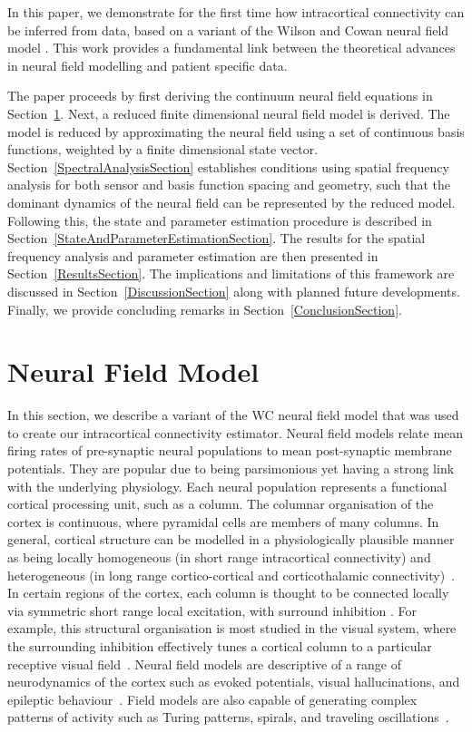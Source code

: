 \documentclass[12pt]{iopart}
\begin{document}
In this paper, we demonstrate for the first time how intracortical connectivity can be inferred from data, based on a variant of the Wilson and Cowan neural field model \cite{Wilson1973}. This work provides a fundamental link between the theoretical advances in neural field modelling and patient specific data.

The paper proceeds by first deriving the continuum neural field equations in Section~\ref{NeuralModelSection}. Next, a reduced finite dimensional neural field model is derived. The model is reduced by approximating the neural field using a set of continuous basis functions, weighted by a finite dimensional state vector. Section~\ref{SpectralAnalysisSection} establishes conditions using spatial frequency analysis for both sensor and basis function spacing and geometry, such that the dominant dynamics of the neural field can be represented by the reduced model. Following this, the state and parameter estimation procedure is described in Section~\ref{StateAndParameterEstimationSection}. The results for the spatial frequency analysis and parameter estimation are then presented in Section~\ref{ResultsSection}. The implications and limitations of this framework are discussed in Section~\ref{DiscussionSection} along with planned future developments. Finally, we provide concluding remarks in Section~\ref{ConclusionSection}.

\section{Neural Field Model}\label{NeuralModelSection} In this section, we describe a variant of the WC neural field model that was used to create our intracortical connectivity estimator. Neural field models relate mean firing rates of pre-synaptic neural populations to mean post-synaptic membrane potentials. They are popular due to being parsimonious yet having a strong link with the underlying physiology. Each neural population represents a functional cortical processing unit, such as a column. The columnar organisation of the cortex is continuous, where pyramidal cells are members of many columns. In general, cortical structure can be modelled in a physiologically plausible manner as being locally homogeneous (in short range intracortical connectivity) and heterogeneous (in long range cortico-cortical and corticothalamic connectivity)~\cite{Jirsa2009,Qubbaj2007}. In certain regions of the cortex, each column is thought to be connected locally via symmetric short range local excitation, with surround inhibition \cite{Braitenberg1998}. For example, this structural organisation is most studied in the visual system, where the surrounding inhibition effectively tunes a cortical column to a particular receptive visual field~\cite{Sullivan2006}. Neural field models are descriptive of a range of neurodynamics of the cortex such as evoked potentials, visual hallucinations, and epileptic behaviour~\cite{David2003,Bressloff2001,Breakspear2006}. Field models are also capable of generating complex patterns of activity such as Turing patterns, spirals, and traveling oscillations~\cite{Amari1977,Coombes2005,Coombes2007}.
\end{document}
